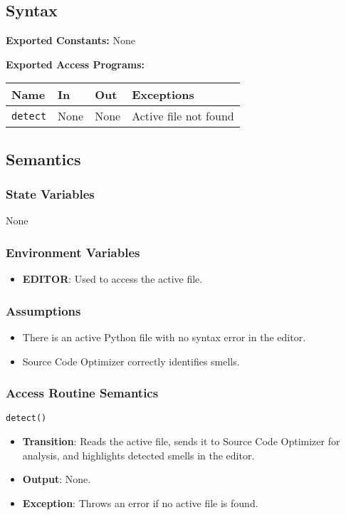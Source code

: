 \documentclass[12pt, titlepage]{article}
\begin{document}
\subsection{Syntax}

\textbf{Exported Constants:} None

\textbf{Exported Access Programs:}\\
\begin{tabularx}{\linewidth}{|l|>{\raggedright\arraybackslash}X|l|l|}
  \hline
  \textbf{Name} & \textbf{In} & \textbf{Out} & \textbf{Exceptions} \\
  \hline
  \texttt{detect} & None & None & Active file not found \\
  \hline
\end{tabularx}

\subsection{Semantics}

\subsubsection{State Variables}
None

\subsubsection{Environment Variables}
\begin{itemize}
\item \textbf{EDITOR}: Used to access the active file.
\end{itemize}

\subsubsection{Assumptions}
\begin{itemize}
\item There is an active Python file with no syntax error in the editor.
\item Source Code Optimizer correctly identifies smells.
\end{itemize}

\subsubsection{Access Routine Semantics}
\texttt{detect()}
\begin{itemize}
\item \textbf{Transition}: Reads the active file, sends it to Source Code Optimizer for analysis, and highlights detected smells in the editor.
\item \textbf{Output}: None.
\item \textbf{Exception}: Throws an error if no active file is found.
\end{itemize}
\end{document}
